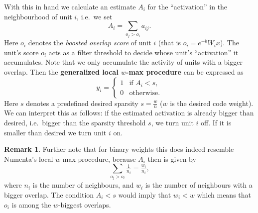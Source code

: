 \documentclass[titlepage]{amsart}
\theoremstyle{definition}
\newtheorem*{rem*}{Remark}
\begin{document}
With this in hand we calculate an estimate $A_i$ for the ``activation''
in the neighbourhood of unit $i$, i.e.\ we set
\[
    A_i = \mathop{\sum}\limits_{o_j > o_i} a_{ij}.
\]
Here $o_i$ denotes the \textit{boosted overlap score} of unit $i$ (that is $o_i = e^{-b} W_i x$).
The unit's score $o_i$ acts as a filter threshold to decide whose unit's ``activation'' it accumulates.
Note that we only accumulate the activity of units with a bigger overlap.
Then the \textbf{generalized local $w$-max procedure} can be expressed as
% 
\begin{equation}
\label{eqn:numenta unit activity}
      y_i = \begin{cases}
                1 & \text{if } A_i < s, \\
                0 & \text{otherwise}.
            \end{cases}
\end{equation}
% 
Here $s$ denotes a predefined desired sparsity $s = \tfrac{w}{n}$ ($w$ is the desired code weight). 
We can interpret this as follows: if the estimated activation is already bigger than desired,
i.e.\ bigger than the sparsity threshold $s$, we turn unit $i$ off. If it is smaller than
desired we turn unit $i$ on.
% 
\begin{rem*}
Further note that for binary weights this does indeed resemble Numenta's local $w$-max procedure,
because $A_i$ then is given by 
\[
  \mathop{\sum}\limits_{o_j > o_i} \tfrac{1}{n_i} = \tfrac{w_i}{n_i},
\]
where $n_i$ is the number of neighbours, and $w_i$ is the number of neighbours with a bigger overlap.
The condition $A_i < s$ would imply that $w_i < w$ which means that $o_i$ is among the $w$-biggest overlaps.
\end{rem*}
% 
%
\end{document}
